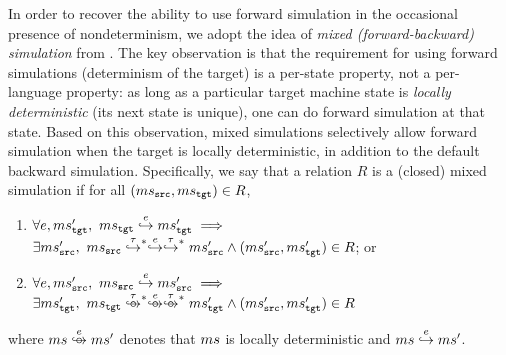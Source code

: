In order to recover the ability to use forward simulation in the occasional presence of nondeterminism,
we adopt the idea of \emph{mixed (forward-backward) simulation} from \cite{neis:pilsner}.
The key observation is that
the requirement for using forward simulations (\ie determinism of the target) is a per-state property,
not a per-language property: as long as a particular target machine state is \emph{locally deterministic} (\ie its next state is unique),
one can do forward simulation at that state.
Based on this observation, mixed simulations selectively allow forward
simulation when the target is locally deterministic, in addition to
the default backward simulation.
%
Specifically, we say that a relation $R$ is a (closed) mixed simulation if
for all $(ms{}_{\texttt{src}{}}, ms{}_{\texttt{tgt}{}}) \in R$,
\begin{enumerate}
\item
  $\forall e, ms{}_{\texttt{tgt}{}}',~ ms{}_{\texttt{tgt}{}} \stackrel{e}{\hookrightarrow} ms{}_{\texttt{tgt}{}}' \implies {} $ \\
  $ \exists \mssrc',~ \mssrc \estep{\tau}^{\raisebox{-1mm}{\scriptsize$\ast$}} \estep{e}\estep{\tau}^{\raisebox{-1mm}{\scriptsize$\ast$}} \mssrc' \land (\mssrc', \mstgt') \in R$; or
\item
  $\forall e, ms{}_{\texttt{src}{}}',~ ms{}_{\texttt{src}{}} \stackrel{e}{\hookrightarrow} ms{}_{\texttt{src}{}}' \implies {} $ \\
  $ \exists \mstgt',~ \mstgt \eustep{\tau}^{\raisebox{-1mm}{\scriptsize$\ast$}} \eustep{e}\eustep{\tau}^{\raisebox{-1mm}{\scriptsize$\ast$}} \mstgt' \land (\mssrc', \mstgt') \in R$\\
\end{enumerate}
where $\ms \eustep{e} \ms'$ denotes that $ms$ is locally deterministic and $ms \stackrel{e}{\hookrightarrow} ms'$.

